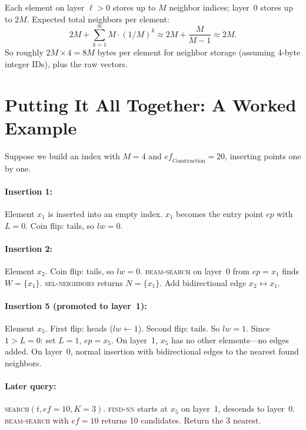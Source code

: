 \documentclass[11pt]{article}
\newcommand{\eps}{\mathit{ep}}
\newcommand{\ef}{\mathit{ef}}
\newcommand{\lw}{\mathit{lw}}
\theoremstyle{definition}
\begin{document}
Each element on layer $\ell > 0$ stores up to $M$ neighbor indices; layer~0 stores up to $2M$. Expected total neighbors per element:
\[
  2M + \sum_{k=1}^{\infty} M \cdot (1/M)^k \approx 2M + \frac{M}{M-1} \approx 2M.
\]
So roughly $2M \times 4 = 8M$ bytes per element for neighbor storage (assuming 4-byte integer IDs), plus the raw vectors.

\section{Putting It All Together: A Worked Example}

Suppose we build an index with $M = 4$ and $\ef_{\mathrm{Construction}} = 20$, inserting points one by one.

\paragraph{Insertion 1:} Element $x_1$ is inserted into an empty index. $x_1$ becomes the entry point $\eps$ with $L = 0$. Coin flip: tails, so $\lw = 0$.

\paragraph{Insertion 2:} Element $x_2$. Coin flip: tails, so $\lw = 0$. \textsc{beam-search} on layer~0 from $\eps = x_1$ finds $W = \{x_1\}$. \textsc{sel-neighbors} returns $N = \{x_1\}$. Add bidirectional edge $x_2 \leftrightarrow x_1$.

\paragraph{Insertion 5 (promoted to layer~1):} Element $x_5$. First flip: heads ($\lw \gets 1$). Second flip: tails. So $\lw = 1$. Since $1 > L = 0$: set $L = 1$, $\eps = x_5$. On layer~1, $x_5$ has no other elements---no edges added. On layer~0, normal insertion with bidirectional edges to the nearest found neighbors.

\paragraph{Later query:} \textsc{search}$(t, \ef=10, K=3)$. \textsc{find-nn} starts at $x_5$ on layer~1, descends to layer~0. \textsc{beam-search} with $\ef=10$ returns 10 candidates. Return the 3 nearest.

\end{document}
